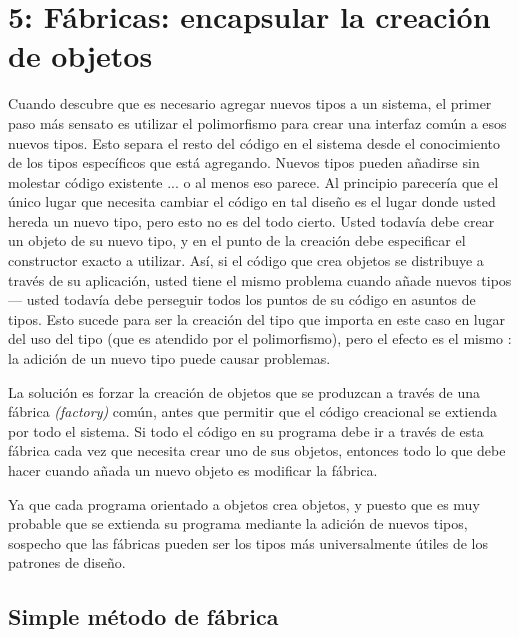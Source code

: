 \section*{\texorpdfstring{5: Fábricas: \newline  encapsular \newline la creación de objetos}{5: Fábricas: encapsular la creación de objetos}}
\label{sec:felcdo}

Cuando descubre que es necesario agregar nuevos tipos a un sistema, el primer paso más sensato es utilizar el polimorfismo para crear una interfaz común a esos nuevos tipos. Esto separa el resto del código en el sistema desde el conocimiento de los tipos específicos que está agregando. Nuevos tipos pueden añadirse sin molestar código existente ... o al menos eso parece. Al principio parecería que el único lugar que necesita cambiar el código en tal diseño es el lugar donde usted hereda un nuevo tipo, pero esto no es del todo cierto. Usted todavía debe crear un objeto de su nuevo tipo, y en el punto de la creación debe especificar el constructor exacto a utilizar. Así, si el código que crea objetos se distribuye a través de su aplicación, usted tiene el mismo problema cuando añade nuevos tipos — usted todavía debe perseguir todos los puntos de su código en asuntos de tipos. Esto sucede para ser la creación del tipo que importa en este caso en lugar del uso del tipo (que es atendido por el polimorfismo), pero el efecto es el mismo : la adición de un nuevo tipo puede causar problemas. \newline

La solución es forzar la creación de objetos que se produzcan a través de una fábrica \textit{(factory)} común, antes que permitir que el código creacional se extienda por todo el sistema. Si todo el código en su programa debe ir a través de esta fábrica cada vez que necesita crear uno de sus objetos, entonces todo lo que debe hacer cuando añada un nuevo objeto es modificar la fábrica.   \newline

Ya que cada programa orientado a objetos crea objetos, y puesto que es muy probable que se extienda su programa mediante la adición de nuevos tipos, sospecho que las fábricas pueden ser los tipos más universalmente útiles de los patrones de diseño.  \newline

\subsection*{Simple método de fábrica}
\label{subsec:smdf}

